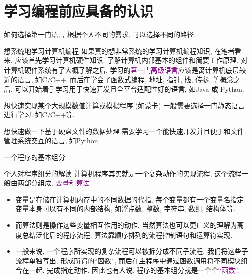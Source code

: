 \documentclass{beamer}
\newcommand{\purple}{\textcolor{purple}}
\begin{document}
  \section{学习编程前应具备的认识}
    \begin{frame}{如何选择第一门语言}
      根据个人不同的需求, 可以选择不同的路径.
      \begin{block}{想系统地学习计算机编程}
        如果真的想非常系统的学习计算机编程知识, 在笔者看来, 应该首先学习计算机硬件知识. 了解计算机内部基本的组件和简要工作原理. 对计算机硬件系统有了大概了解之后, 学习的\purple{第一门高级语言}应该是离计算机底层较近的语言, 如C/C++. 而后在学会了函数式编程, 地址, 指针, 栈, 传参, 等概念之后, 可以开始着手学习用于快速开发且全平台适配性好的语言, 如Java 或 Python.
      \end{block}
      \begin{block}{想快速实现某个大规模数值计算或模拟程序 (如蒙卡)}
        一般需要选择一门静态语言进行学习. 如C/C++等.
      \end{block}
      \begin{block}{想快速做一下基于硬盘文件的数据处理}
        需要学习一个能快速开发并且便于和文件管理系统交互的语言, 如Python.
      \end{block}
    \end{frame}

    \begin{frame}{一个程序的基本组分}
      \begin{block}{个人对程序组分的解读}
        计算机程序其实就是一个复杂动作的实现流程, 这个流程一般由两部分组成, \textcolor{purple}{变量和算法}. 
      \begin{itemize}
        \item 变量是存储在计算机内存中的不同数据的代指, 每个变量都有一个变量名指定. 变量本身可以有不同的内部结构, 如浮点数, 整数, 字符串, 数组, 结构体等.
        \item 而算法则是操作这些变量相互作用的动作, 当然算法也可以更广义的理解为高度总结泛化后的程序流程. 算法靠顺序排列的流程控制语句和运算符实现.
        \item 一般来说, 一个程序所实现的复杂流程可以被拆分成不同子流程. 我们将这些子流程单独写出, 形成所谓的``函数'', 而后在主程序中通过函数调用将不同模块组合在一起, 完成指定动作. 因此也有人说, 程序的基本组分就是一个个\purple{``函数''}.
      \end{itemize}
    \end{block}
    \end{frame}
\end{document}
